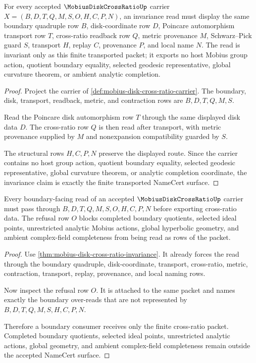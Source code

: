 \begin{theorem}
\label{thm:mobius-disk-cross-ratio-invariance}
For every accepted $\MobiusDiskCrossRatioUp$ carrier $X=(B,D,T,Q,M,S,O,H,C,P,N)$, an invariance read must display the same boundary quadruple row $B$, disk-coordinate row $D$, Poincare automorphism transport row $T$, cross-ratio readback row $Q$, metric provenance $M$, Schwarz--Pick guard $S$, transport $H$, replay $C$, provenance $P$, and local name $N$. The read is invariant only as this finite transported packet; it exports no host Mobius group action, quotient boundary equality, selected geodesic representative, global curvature theorem, or ambient analytic completion.
\end{theorem}
\begin{proof}
Project the carrier of \autoref{def:mobius-disk-cross-ratio-carrier}. The boundary, disk, transport, readback, metric, and contraction rows are $B,D,T,Q,M,S$.

Read the Poincare disk automorphism row $T$ through the same displayed disk data $D$. The cross-ratio row $Q$ is then read after transport, with metric provenance supplied by $M$ and nonexpansion compatibility guarded by $S$.

The structural rows $H,C,P,N$ preserve the displayed route. Since the carrier contains no host group action, quotient boundary equality, selected geodesic representative, global curvature theorem, or analytic completion coordinate, the invariance claim is exactly the finite transported NameCert surface.
\end{proof}

\begin{theorem}
\label{thm:mobius-disk-cross-ratio-boundary-refusal}
Every boundary-facing read of an accepted $\MobiusDiskCrossRatioUp$ carrier must pass through $B,D,T,Q,M,S,O,H,C,P,N$ before exporting cross-ratio data. The refusal row $O$ blocks completed boundary quotients, selected ideal points, unrestricted analytic Mobius actions, global hyperbolic geometry, and ambient complex-field completeness from being read as rows of the packet.
\end{theorem}
\begin{proof}
Use \autoref{thm:mobius-disk-cross-ratio-invariance}. It already forces the read through the boundary quadruple, disk-coordinate, transport, cross-ratio, metric, contraction, transport, replay, provenance, and local naming rows.

Now inspect the refusal row $O$. It is attached to the same packet and names exactly the boundary over-reads that are not represented by $B,D,T,Q,M,S,H,C,P,N$.

Therefore a boundary consumer receives only the finite cross-ratio packet. Completed boundary quotients, selected ideal points, unrestricted analytic actions, global geometry, and ambient complex-field completeness remain outside the accepted NameCert surface.
\end{proof}

